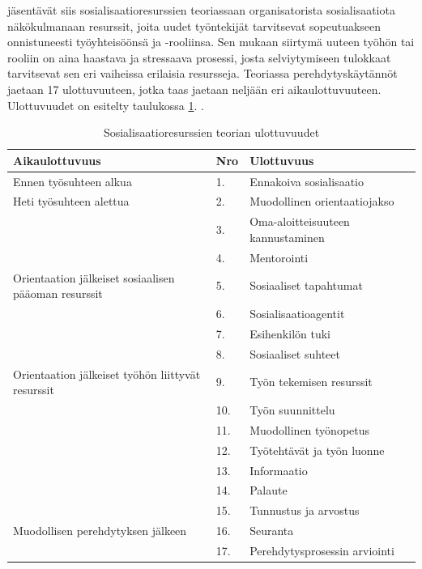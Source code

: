 \documentclass[utf8]{gradu3}
\begin{document}
\textcite{saks-gruman-2012} jäsentävät siis sosialisaatioresurssien teoriassaan organisatorista sosialisaatiota näkökulmanaan resurssit, joita uudet työntekijät tarvitsevat sopeutuakseen onnistuneesti työyhteisöönsä ja -rooliinsa. Sen mukaan siirtymä uuteen työhön tai rooliin on aina haastava ja stressaava prosessi, josta selviytymiseen tulokkaat tarvitsevat sen eri vaiheissa erilaisia resursseja. Teoriassa perehdytyskäytännöt jaetaan 17 ulottuvuuteen, jotka taas jaetaan neljään eri aikaulottuvuuteen. Ulottuvuudet on esitelty taulukossa \ref{tbl:srt-ulottuvuudet}. \parencite{saks-gruman-2012}.

\begin{table}[h]
    \footnotesize
    \begin{tabular}{llll}
        \toprule
        \textbf{Aikaulottuvuus} & \textbf{Nro} & \textbf{Ulottuvuus} \\
        \toprule
        Ennen työsuhteen alkua & 1. & Ennakoiva sosialisaatio \\
        \midrule
        Heti työsuhteen alettua & 2. & Muodollinen orientaatiojakso \\
        & 3. & Oma-aloitteisuuteen kannustaminen \\
        & 4. & Mentorointi \\
        \midrule
        Orientaation jälkeiset sosiaalisen pääoman resurssit & 5. & Sosiaaliset tapahtumat \\
        & 6. & Sosialisaatioagentit \\
        & 7. & Esihenkilön tuki \\
        & 8. & Sosiaaliset suhteet \\
        \midrule
        Orientaation jälkeiset työhön liittyvät resurssit & 9. & Työn tekemisen resurssit \\
        & 10. & Työn suunnittelu \\
        & 11. & Muodollinen työnopetus \\
        & 12. & Työtehtävät ja työn luonne \\
        & 13. & Informaatio \\
        & 14. & Palaute \\
        & 15. & Tunnustus ja arvostus \\
        \midrule
        Muodollisen perehdytyksen jälkeen & 16. & Seuranta \\
        & 17. & Perehdytysprosessin arviointi \\
        \bottomrule
    \end{tabular}
    \caption{Sosialisaatioresurssien teorian ulottuvuudet \parencite{saks-gruman-2012}}
    \label{tbl:srt-ulottuvuudet}
\end{table}
\end{document}
